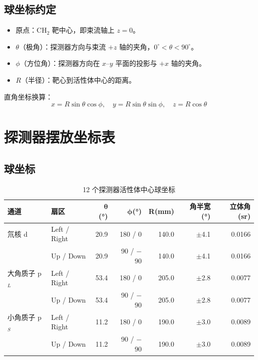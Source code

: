 \documentclass[UTF8,10pt,letterpaper,fontset=none]{ctexart}
\begin{document}
\subsection{球坐标约定}

\begin{itemize}[nosep,leftmargin=1.5em]
  \item 原点：CH$_2$ 靶中心，即束流轴上 $z = 0$。
  \item $\theta$（极角）：探测器方向与束流 $+z$ 轴的夹角，$0^\circ < \theta < 90^\circ$。
  \item $\phi$（方位角）：探测器方向在 $x$--$y$ 平面的投影与 $+x$ 轴的夹角。
  \item $R$（半径）：靶心到活性体中心的距离。
\end{itemize}

直角坐标换算：
\[
x = R\sin\theta\cos\phi, \quad
y = R\sin\theta\sin\phi, \quad
z = R\cos\theta
\]

\section{探测器摆放坐标表}\label{sec:tables}

\subsection{球坐标}

\begin{table}[h]
\centering
\sffamily\small
\caption{12 个探测器活性体中心球坐标}
\label{tab:spherical}
\renewcommand{\arraystretch}{1.25}
\begin{tabular}{ll rrr rr}
\toprule
\textbf{通道} & \textbf{扇区} & $\boldsymbol{\theta}$(°) & $\boldsymbol{\phi}$(°) & \textbf{R}(mm) & \textbf{角半宽}(°) & \textbf{立体角}(sr) \\
\midrule
\rowcolor{DetD!8}
氘核 d      & Left / Right & 20.9 & 180 / 0   & 140.0 & $\pm$4.1 & 0.0166 \\
\rowcolor{DetD!8}
            & Up / Down    & 20.9 & 90 / $-$90 & 140.0 & $\pm$4.1 & 0.0166 \\
\midrule
\rowcolor{DetPL!8}
大角质子 p$_L$ & Left / Right & 53.4 & 180 / 0   & 205.0 & $\pm$2.8 & 0.0077 \\
\rowcolor{DetPL!8}
            & Up / Down    & 53.4 & 90 / $-$90 & 205.0 & $\pm$2.8 & 0.0077 \\
\midrule
\rowcolor{DetPS!8}
小角质子 p$_S$ & Left / Right & 11.2 & 180 / 0   & 190.0 & $\pm$3.0 & 0.0089 \\
\rowcolor{DetPS!8}
            & Up / Down    & 11.2 & 90 / $-$90 & 190.0 & $\pm$3.0 & 0.0089 \\
\bottomrule
\end{tabular}
\end{table}
\end{document}
